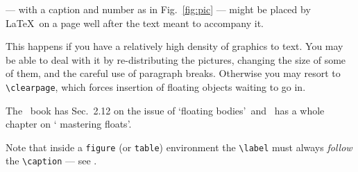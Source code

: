--- with a caption and number as in Fig.~\ref{fig:pic} --- might be
placed by \LaTeX\ on a page well after the text meant to accompany it.
\par
This happens if you have a relatively high density of graphics to
text. You may be able to deal with it by re-distributing the
pictures, changing the size of some of them, and the careful use of
paragraph breaks. Otherwise you may resort to \verb+\clearpage+,
which forces insertion of floating objects waiting to go in.
\par
The \nss\ book \cite{NSS} has Sec.~2.12 on the issue of \lq floating
bodies\rq\ and \comp\ has a whole chapter \cite[Chap.~6]{MG} on \lq
mastering floats'.
\par
Note that inside a \verb+figure+ (or \verb+table+) environment the 
\verb+\label+ must always {\em follow} the \verb+\caption+ --- see 
\cite[p.~67]{MG}.
\par
